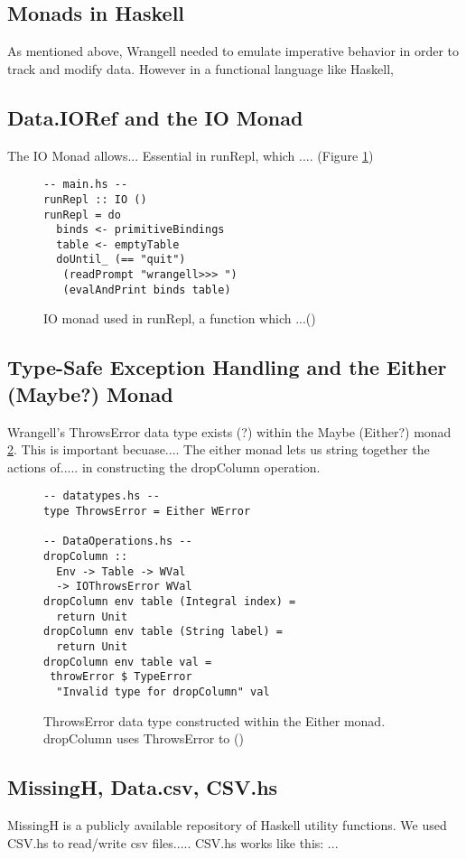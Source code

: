 \documentclass[preprint,nocopyrightspace]{sig-alternate}
\begin{document}
\subsection{Monads in Haskell}
As mentioned above, Wrangell needed to emulate imperative behavior in order to track and modify data. However in a functional language like Haskell, 

\subsection{Data.IORef and the IO Monad}
The IO Monad allows...
Essential in runRepl, which .... (Figure \ref{runReplIO})


\begin{figure}
\caption{IO monad used in runRepl, a function which ...()}
\label{runReplIO}
\begin{lstlisting}
-- main.hs --
runRepl :: IO ()
runRepl = do
  binds <- primitiveBindings
  table <- emptyTable
  doUntil_ (== "quit")
   (readPrompt "wrangell>>> ") 
   (evalAndPrint binds table)
\end{lstlisting}
\end{figure} 

\subsection{Type-Safe Exception Handling and the Either (Maybe?) Monad}
Wrangell's ThrowsError data type exists (?) within the Maybe (Either?) monad  \ref{eitherThrowsError}.
This is important becuase....
The either monad lets us string together the actions of..... in constructing the dropColumn operation. 
\begin{figure}
\caption{ThrowsError data type constructed within the Either monad. dropColumn uses ThrowsError to ()}
\label{eitherThrowsError}
\begin{lstlisting}
-- datatypes.hs -- 
type ThrowsError = Either WError

-- DataOperations.hs --
dropColumn :: 
  Env -> Table -> WVal 
  -> IOThrowsError WVal
dropColumn env table (Integral index) = 
  return Unit
dropColumn env table (String label) = 
  return Unit
dropColumn env table val =
 throwError $ TypeError 
  "Invalid type for dropColumn" val
\end{lstlisting}
\end{figure} 

\subsection{MissingH, Data.csv, CSV.hs}
MissingH is a publicly available repository of Haskell utility functions. We used CSV.hs to read/write csv files..... CSV.hs works like this: ... 
\end{document}
